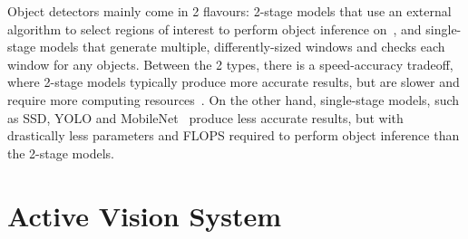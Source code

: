 \documentclass[runningheads]{llncs}
\begin{document}
Object detectors mainly come in 2 flavours: 2-stage models that use an external algorithm to select regions of interest to perform object inference on~\cite{ren2015faster}, and single-stage models that generate multiple, differently-sized windows and checks each window for any objects.
Between the 2 types, there is a speed-accuracy tradeoff, where 2-stage models typically produce more accurate results, but are slower and require more computing resources~\cite{liu2018deeplf}.
On the other hand, single-stage models, such as SSD, YOLO and MobileNet~\cite{liu2016ssd,redmon2018yolo,howard2017mobilenet} produce less accurate results, but with drastically less parameters and FLOPS required to perform object inference than the 2-stage models. 

\section{Active Vision System}\label{sec:active-vision}

\end{document}
